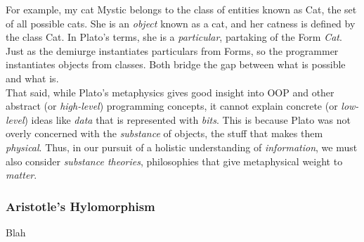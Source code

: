 For example, my cat Mystic belongs to the class of entities known as Cat, the set of all possible cats. She is an \textit{object} known as a cat, and her catness is defined by the class Cat. In Plato's terms, she is a \textit{particular}, partaking of the Form \textit{Cat}. Just as the demiurge instantiates particulars from Forms, so the programmer instantiates objects from classes. Both bridge the gap between what is possible and what is. \\

That said, while Plato's metaphysics gives good insight into OOP and other abstract (or \textit{high-level}) programming concepts, it cannot explain concrete (or \textit{low-level}) ideas like \textit{data} that is represented with \textit{bits}. This is because Plato was not overly concerned with the \textit{substance} of objects, the stuff that makes them \textit{physical}. Thus, in our pursuit of a holistic understanding of \textit{information}, we must also consider \textit{substance theories}, philosophies that give metaphysical weight to \textit{matter}. \\


\subsubsection{Aristotle's Hylomorphism}

Blah \\




